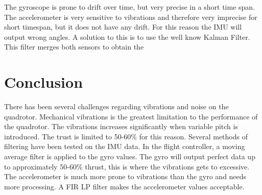 The gyroscope is prone to drift over time, but very precise in a short time span.  The accelerometer is very sensitive to vibrations and therefore very imprecise for short timespan, but it does not have any drift. For this reason the IMU will output wrong angles. A solution to this is to use the well know Kalman Filter. This filter merges both sensors to obtain the 

\section{Conclusion}
There has been several challenges regarding vibrations and noise on the quadrotor. Mechanical vibrations is the greatest limitation to the performance of the quadrotor. The vibrations increases significantly when variable pitch is introduced. The trust is limited to 50-60\% for this reason. Several methods of filtering have been tested on the IMU data. In the flight controller, a moving average filter is applied to the gyro values. The gyro will output perfect data up to approximately 50-60\% thrust, this is where the vibrations gets to excessive. The accelerometer is much more prone to vibrations than the gyro and needs more processing. A FIR LP filter makes the accelerometer values acceptable. 




